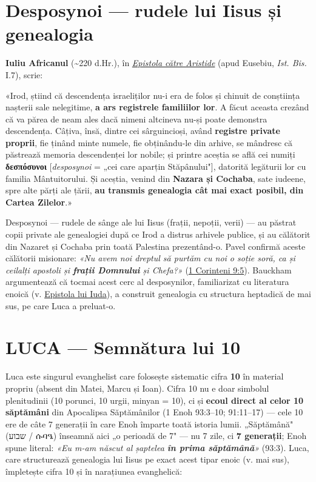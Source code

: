 \documentclass[12pt,a4paper,twoside,openany]{book}
\begin{document}
\section{Desposynoi — rudele lui Iisus și genealogia}
\textbf{Iuliu Africanul} (\textasciitilde{}220 d.Hr.), în \href{https://www.newadvent.org/fathers/0614.htm}{\textit{Epistola către Aristide}} (apud Eusebiu, \textit{Ist. Bis.} I.7), scrie:


\begin{biblequote}
«Irod, știind că descendența israeliților nu-i era de folos și chinuit de conștiința nașterii sale nelegitime, \textbf{a ars registrele familiilor lor}. A făcut aceasta crezând că va părea de neam ales dacă nimeni altcineva nu-și poate demonstra descendența. Câțiva, însă, dintre cei sârguincioși, având \textbf{registre private proprii}, fie ținând minte numele, fie obținându-le din arhive, se mândresc că păstrează memoria descendenței lor nobile; și printre aceștia se află cei numiți \textbf{δεσπόσυνοι} [\textit{desposynoi} = „cei care aparțin Stăpânului"], datorită legăturii lor cu familia Mântuitorului. Și aceștia, venind din \textbf{Nazara și Cochaba}, sate iudeene, spre alte părți ale țării, \textbf{au transmis genealogia cât mai exact posibil, din Cartea Zilelor}.»
\end{biblequote}
Desposynoi — rudele de sânge ale lui Iisus (frații, nepoții, verii) — au păstrat copii private ale genealogiei după ce Irod a distrus arhivele publice, și au călătorit din Nazaret și Cochaba prin toată Palestina prezentând-o. Pavel confirmă aceste călătorii misionare: \textit{«Nu avem noi dreptul să purtăm cu noi o soție soră, ca și ceilalți apostoli și \textbf{frații Domnului} și Chefa?»} (\href{https://bibliaortodoxa.ro/carte.php?id=12\&cap=9\#5}{1 Corinteni 9:5}). Bauckham argumentează că tocmai acest cerc al desposynilor, familiarizat cu literatura enoică (v. \href{https://bibliaortodoxa.ro/carte.php?id=44\&cap=1\#14}{Epistola lui Iuda}), a construit genealogia cu structura heptadică de mai sus, pe care Luca a preluat-o.


\section{LUCA — Semnătura lui 10}
Luca este singurul evanghelist care folosește sistematic cifra \textbf{10} în material propriu (absent din Matei, Marcu și Ioan). Cifra 10 nu e doar simbolul plenitudinii (10 porunci, 10 urgii, minyan = 10), ci și \textbf{ecoul direct al celor 10 săptămâni} din Apocalipsa Săptămânilor (1 Enoh 93:3–10; 91:11–17) — cele 10 ere de câte 7 generații în care Enoh împarte toată istoria lumii. „Săptămână" (שבוע / {\geezfont ሱባዔ}) înseamnă aici „o perioadă de 7" — nu 7 zile, ci \textbf{7 generații}; Enoh spune literal: \textit{«Eu m-am născut al șaptelea \textbf{în prima săptămână}»} (93:3). Luca, care structurează genealogia lui Iisus pe exact acest tipar enoic (v. mai sus), împletește cifra 10 și în narațiunea evanghelică:
\end{document}
